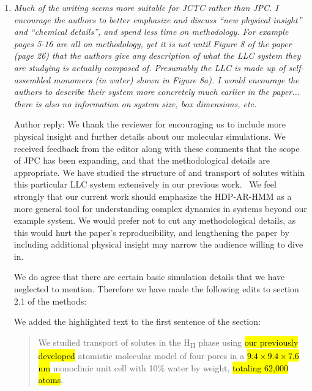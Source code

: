 \documentclass{article}
\begin{document}
\begin{enumerate}[label={Comment \theenumi :}, leftmargin=3.9\parindent]
    \item \textit{Much of the writing seems more suitable for JCTC rather than JPC. I encourage the
    authors to better emphasize and discuss “new physical insight” and “chemical details”, and spend
    less time on methodology. For example pages 5-16 are all on methodology, yet it is not until 
    Figure 8 of the paper (page 26) that the authors give any description of what the LLC system 
    they are studying is actually composed of. Presumably the LLC is made up of self-assembled 
    monomers (in water) shown in Figure 8a). I would encourage the authors to describe their 
    system more concretely much earlier in the paper... there is also no information on system 
    size, box dimensions, etc.}
    
    Author reply: We thank the reviewer for encouraging us to include more physical insight and
    further details about our molecular simulations. We received feedback from the editor along 
    with these comments that the scope of JPC has been expanding, and that the methodological 
    details are appropriate. We have studied the structure of and transport of solutes within 
    this particular LLC system extensively in our previous work.~\cite{coscia_chemically_2019}
    We feel strongly that our current work should emphasize the HDP-AR-HMM as a more general 
    tool for understanding complex dynamics in systems beyond our example system. We would prefer
    not to cut any methodological details, as this would hurt the paper's reproducibility, and
    lengthening the paper by including additional physical insight may narrow the audience willing
    to dive in.
    
    We do agree that there are certain basic simulation details that we have neglected to 
    mention. Therefore we have made the following edits to section 2.1 of the methods:
    
    We added the highlighted text to the first sentence of the section:
    \begin{quote}
      We studied transport of solutes in the H\textsubscript{II} phase using \hl{our
      previously developed} atomistic molecular model of four pores in a 
      \hl{$9.4\times9.4\times7.6$ nm} monoclinic unit cell with 10\% water by weight, 
      \hl{totaling 62,000 atoms}.    
    \end{quote}
    

\end{enumerate}
\end{document}

